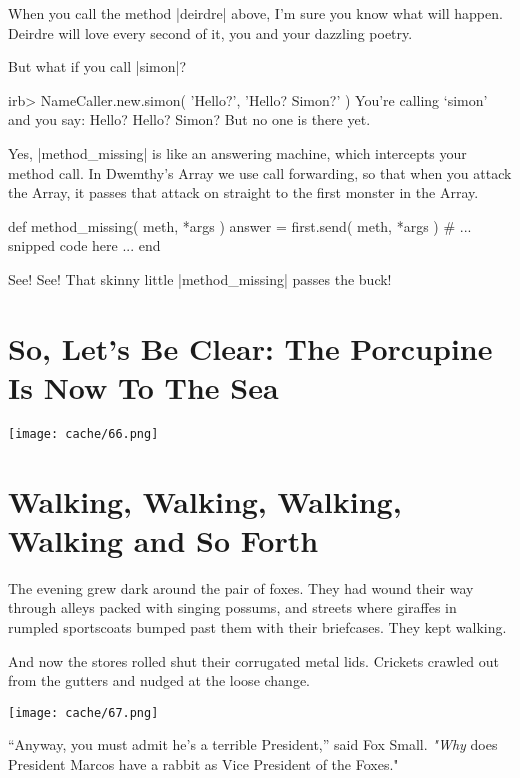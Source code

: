 \documentclass[12pt,twoside]{report}
\begin{document}
When you call the method \rubyinline|deirdre| above,
I'm sure you know what will happen.  Deirdre will love every second of
it, you and your dazzling poetry.

But what if you call \rubyinline|simon|?


\begin{consolecode}

 irb> NameCaller.new.simon( 'Hello?', 'Hello? Simon?' )
 You're calling `simon' and you say:
   Hello?
   Hello? Simon?
 But no one is there yet.

\end{consolecode}


Yes, \rubyinline|method_missing| is like an answering
machine, which intercepts your method call.  In Dwemthy's Array we use
call forwarding, so that when you attack the Array, it passes that
attack on straight to the first monster in the Array.


\begin{rubycode}

 def method_missing( meth, *args )
   answer = first.send( meth, *args )
   # ... snipped code here ...
 end

\end{rubycode}


See!  See!  That skinny little
\rubyinline|method_missing| passes the buck!


\section{So, Let's Be Clear: The Porcupine Is Now To The Sea}


	\texttt{[image: cache/66.png]}


\section{Walking, Walking, Walking, Walking and So Forth}


The evening grew dark around the pair of foxes.  They had wound their
way through alleys packed with singing possums, and streets where
giraffes in rumpled sportscoats bumped past them with their
briefcases.  They kept walking.

And now the stores rolled shut their corrugated metal lids.  Crickets
crawled out from the gutters and nudged at the loose change.

	\texttt{[image: cache/67.png]}

``Anyway, you must admit he's a terrible President,'' said Fox
        Small. {\em "Why} does President Marcos have a rabbit as Vice
        President of the Foxes."
\end{document}
